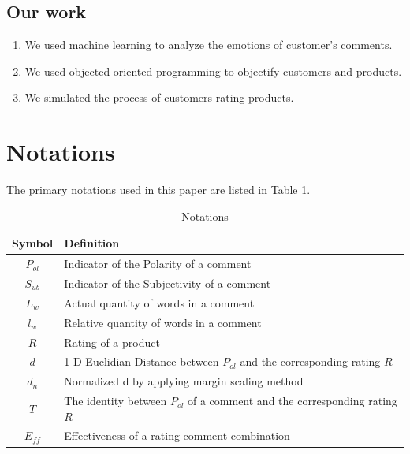 \documentclass[12pt]{article}  %
\begin{document}
\subsection{Our work}
\begin{enumerate}[\bfseries 1.]
    \item We used machine learning to analyze the emotions of customer's comments.
    \item We used objected oriented programming to objectify customers and products.
    \item We simulated the process of customers rating products.
\end{enumerate}




\section{Notations}
The primary notations used in this paper are listed in Table \ref{tb:notation}.
\begin{table}[!htbp]
\begin{center}
\caption{Notations}
\begin{tabular}{cl}
	\toprule
	\multicolumn{1}{m{3cm}}{\centering Symbol}
	&\multicolumn{1}{m{12cm}}{Definition}\\
	\midrule
  $P_{ol}$&Indicator of the Polarity of a comment\\

$S_{ub}$&Indicator of the Subjectivity of a comment\\

$L_{w}$&Actual quantity of words in a comment\\

$l_{w}$&Relative quantity of words in a comment\\

${R}$&Rating of a product\\

$d$&1-D Euclidian Distance between $P_{ol}$ and the corresponding rating ${R}$\\

$d_{n}$&Normalized d by applying margin scaling method\\

$T$&The identity between $P_{ol}$ of a comment and the corresponding rating ${R}$\\

$E_{ff}$&Effectiveness of a rating-comment combination\\
	\bottomrule
\end{tabular}\label{tb:notation}
\end{center}
\end{table}
\end{document}
